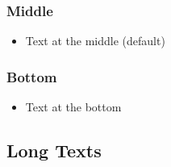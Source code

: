 \documentclass[usepdftitle=false,professionalfonts,compress ]{beamer}
\begin{document}
{
\begin{frame}\frametitle{Middle}
	\begin{itemize}

		\item Text at the middle (default)
	\end{itemize}

\end{frame}
}



{
\begin{frame}[b]\frametitle{Bottom}
	\begin{itemize}

		\item Text at the bottom
	\end{itemize}

\end{frame}
}




\subsection{Long Texts}
\end{document}
